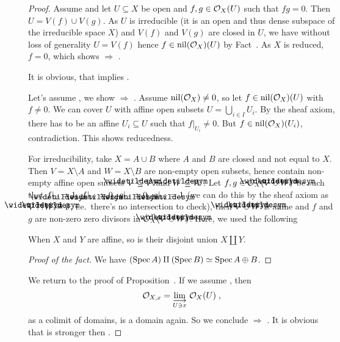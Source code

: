 \documentclass[a4paper,parskip=half,numbers=enddot, DIV=12]{scrreprt}
\begin{document}
\begin{proof}
    Assume  and let $U\subseteq X$ be open and $f,g\in \mathcal{O}_X(U)$ such that $fg = 0$. Then $U = V(f)\cup V(g)$. As $U$ is irreducible (it is an open and thus dense subspace of the irreducible space $X$) and $V(f)$ and $V(g)$ are closed in $U$, we have without loss of generality $U = V(f)$ hence $f\in\operatorname{nil}(\mathcal{O}_X)(U)$ by Fact~. As $X$ is reduced, $f=0$, which shows  $\Rightarrow$ .
    
    It is obvious, that  implies .
    
    Let's assume , we show  $\Rightarrow$ . Assume $\operatorname{nil}(\mathcal{O}_X) \neq 0$, so let $f\in \operatorname{nil}(\mathcal{O}_X)(U)$ with $f\neq 0$. We can cover $U$ with affine open subsets $U=\bigcup_{i\in I}U_i$. By the sheaf axiom, there has to be an affine $U_i \subseteq U$ such that $f|_{U_i} \neq 0$. But $f\in \operatorname{nil}(\mathcal{O}_X)(U_i)$, contradiction. This shows reducedness. 
    
    For irreducibility, take $X=A\cup B$ where $A$ and $B$ are closed and not equal to $X$. Then $V=X\setminus A$ and $W= X\setminus B$ are non-empty open subsets, hence contain non-empty affine open subsets $\snake V \subseteq V$ and $\snake W \subseteq W$. Let $f,g\in \Oo_X(\snake V\cup\snake W)$ be such that $f|_{\snake V} = 1$, $f|_{\snake W} = 0$, $g|_{\snake V} = 0$, $g|_{\snake W} = 1$ (we can do this by the sheaf axiom as $\snake V\cap\snake W=\emptyset$, i.e.\ there's no intersection to check), then $\snake V\cup \snake W$ is affine and $f$ and $g$ are non-zero zero divisors in $\Oo_X(\snake V\cup \snake W)$. Here, we used the following 
    \begin{fact*}
    	When $X$ and $Y$ are affine, so is their disjoint union $X\amalg Y$.
    \end{fact*}
    \begin{proof}[Proof of the fact] 
    	We have $(\operatorname{Spec} A) \amalg (\operatorname{Spec} B) \simeq \operatorname{Spec} A\oplus B$.
    \end{proof}
    
    We return to the proof of Proposition~. If we assume , then 
    \begin{align*}
        \Oo_{X,x} = \colimit[U\ni x] \Oo_X(U)\;,
    \end{align*}
    as a colimit of domains, is a domain again. So we conclude  $\Rightarrow$ . It is obvious that  is stronger then .
    

\end{proof}
\end{document}
